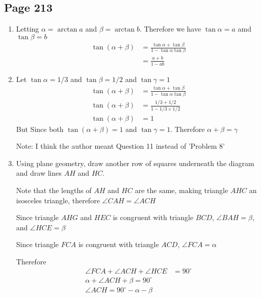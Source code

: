\documentclass{article}
\newenvironment{solutions}[1]
{\subsection*{#1}
 \begin{enumerate}[leftmargin=1.5em]}
{\end{enumerate}}
\newcommand{\solution}{\item}
\begin{document}
\begin{solutions}{Page 213}

\begin{align*}
    \sin (\alpha + \beta)&=\sin\alpha \cos\beta +\cos\alpha \sin\beta\\
    &=3/5 \times 12/13 + 4/5 \times  5/13\\
    &= 56/65
\end{align*}
\solution
Letting $\alpha = \arctan a$ and $\beta = \arctan b$. Therefore we have $\tan \alpha = a$ amd $\tan \beta = b$
\begin{align*}
    \tan(\alpha + \beta)&= \frac{\tan \alpha + \tan \beta}{1-\tan \alpha \tan \beta}\\
                        &= \frac{a+b}{1-ab}
\end{align*}

\solution
Let $\tan \alpha = 1/3$ and $\tan \beta = 1/2$ and $\tan \gamma = 1$
\begin{align*}
    \tan(\alpha + \beta)&= \frac{\tan \alpha + \tan \beta}{1-\tan \alpha \tan \beta}\\
              \tan(\alpha + \beta)&= \frac{1/3+1/2}{1-1/3 \times 1/2}\\
              \tan(\alpha + \beta)&= 1
          \end{align*}
But Since both $\tan (\alpha + \beta)=1$ and $\tan \gamma =1$. Therefore $\alpha + \beta = \gamma$

Note: I think the author meant Question 11 instead of 'Problem 8'
\solution
Using plane geometry, draw another row of squares underneath the diagram and draw lines $AH$ and $HC$.

Note that the lengths of $AH$ and $HC$ are the same, making triangle $AHC$ an isosceles triangle, therefore $\angle CAH = \angle ACH$

Since triangle $AHG$ and $HEC$ is congruent with triangle $BCD$, $\angle BAH = \beta$, and $\angle HCE = \beta$

Since triangle $FCA$ is congruent with triangle $ACD$, $\angle FCA = \alpha$

Therefore 
\begin{align*}
    \angle FCA + \angle ACH + \angle HCE &= 90^{\circ}\\
    \alpha + \angle ACH + \beta = 90^{\circ}\\
    \angle ACH = 90^{\circ} -\alpha -\beta
\end{align*}


\end{solutions}
\end{document}
